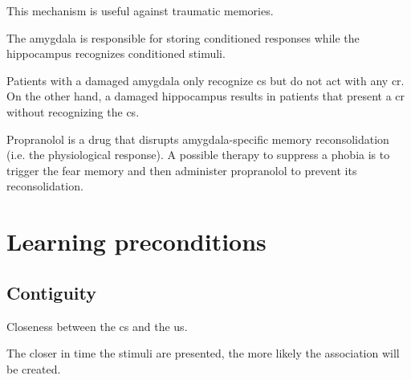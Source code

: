 \begin{remark}
    This mechanism is useful against traumatic memories.
\end{remark}

\begin{remark}
    The amygdala is responsible for storing conditioned responses while the hippocampus recognizes conditioned stimuli.

    Patients with a damaged amygdala only recognize \ac{cs} but do not act with any \ac{cr}.
    On the other hand, a damaged hippocampus results in patients that present a \ac{cr} without recognizing the \ac{cs}.
\end{remark}

\begin{example}
    Propranolol is a drug that disrupts amygdala-specific memory reconsolidation (i.e. the physiological response).
    A possible therapy to suppress a phobia is to trigger the fear memory and then administer propranolol to prevent its reconsolidation.
\end{example}



\section{Learning preconditions}

\subsection{Contiguity}

Closeness between the \acl{cs} and the \acl{us}.

\begin{remark}
    The closer in time the stimuli are presented, the more likely the association will be created.
\end{remark}

